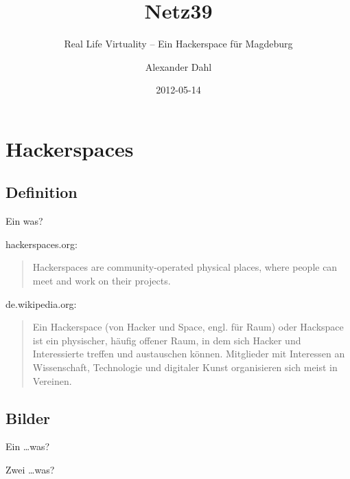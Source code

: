\documentclass[hyperref={pdfpagelabels=false}]{beamer}
\title[Netz39]{Netz39}
\subtitle{Real Life Virtuality -- Ein Hackerspace für Magdeburg}
\author{Alexander Dahl}
\institute[netz39.de]{\url{http://www.netz39.de/}}
\date{2012-05-14}
\begin{document}
\begin{frame}
	\titlepage
\end{frame}


\section{Hackerspaces}

\subsection{Definition}

\begin{frame}{Ein was?}
    \begin{block}{hackerspaces.org:}
        \begin{quote}
            Hackerspaces are community-operated physical places, where people
            can meet and work on their projects.
        \end{quote}
    \end{block}
    \pause
    \begin{block}{de.wikipedia.org:}
        \begin{quote}
            Ein Hackerspace (von Hacker und Space, engl. für Raum) oder
            Hackspace ist ein physischer, häufig offener Raum, in dem sich
            Hacker und Interessierte treffen und austauschen können.
            Mitglieder mit Interessen an Wissenschaft, Technologie und
            digitaler Kunst organisieren sich meist in Vereinen.
        \end{quote}
    \end{block}
\end{frame}

\subsection{Bilder}

\begin{frame}[label=secbaellebad]{Ein \dots was?}
    \begin{figure}
    \end{figure}
\end{frame}

\begin{frame}[label=secddr]{Zwei \dots was?}
    \begin{figure}
    \end{figure}
\end{frame}
\end{document}
